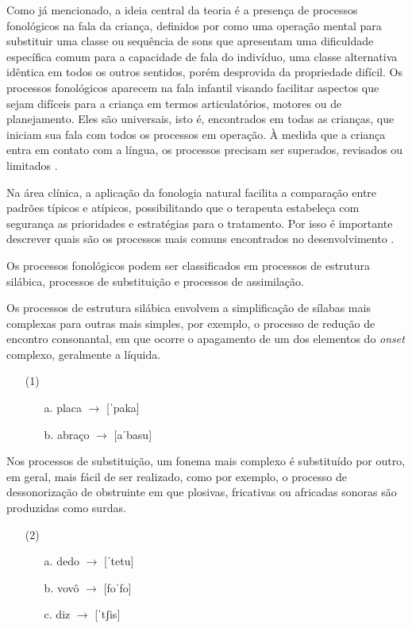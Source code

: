 \documentclass[output=paper,colorlinks,citecolor=brown,booklanguage=portuguese]{langscibook}
\begin{document}
Como já mencionado, a ideia central da teoria é a presença de processos fonológicos na fala da criança, definidos por \citet{Stampe1979a} como uma operação mental para substituir uma classe ou sequência de sons que apresentam uma dificuldade específica comum para a capacidade de fala do indivíduo, uma classe alternativa idêntica em todos os outros sentidos, porém desprovida da propriedade difícil. Os processos fonológicos aparecem na fala infantil visando facilitar aspectos que sejam difíceis para a criança em termos articulatórios, motores ou de planejamento. Eles são universais, isto é, encontrados em todas as crianças, que iniciam sua fala com todos os processos em operação. À medida que a criança entra em contato com a língua, os processos precisam ser superados, revisados ou limitados \citep{Yavas2001}.

Na área clínica, a aplicação da fonologia natural facilita a comparação entre padrões típicos e atípicos, possibilitando que o terapeuta estabeleça com segurança as prioridades e estratégias para o tratamento. Por isso é importante descrever quais são os processos mais comuns encontrados no desenvolvimento \citep{Yavas2001}. 

Os processos fonológicos podem ser classificados em processos de estrutura silábica, processos de substituição e processos de assimilação.

Os processos de estrutura silábica envolvem a simplificação de sílabas mais complexas para outras mais simples, por exemplo, o processo de redução de encontro consonantal, em que ocorre o apagamento de um dos elementos do \emph{onset} complexo, geralmente a líquida. 

\begin{enumerate}
    \item [(1)]	
    \begin{enumerate}
    \item[a.]   placa $\to$ [ˈpaka]
\item[b.]	abraço $\to$ [aˈbasu]
\end{enumerate}
\end{enumerate}

\largerpage
Nos processos de substituição, um fonema mais complexo é substituído por outro, em geral, mais fácil de ser realizado, como por exemplo, o processo de dessonorização de obstruinte em que plosivas, fricativas ou africadas sonoras são produzidas como surdas.

\begin{enumerate}
    \item [(2)]
    \begin{enumerate}
    \item[a.] dedo $\to$ [ˈtetu]
 \item[b.] vovô $\to$ [foˈfo]
 \item[c.] diz $\to$ [ˈtʃis]
\end{enumerate}
\end{enumerate}
\end{document}
